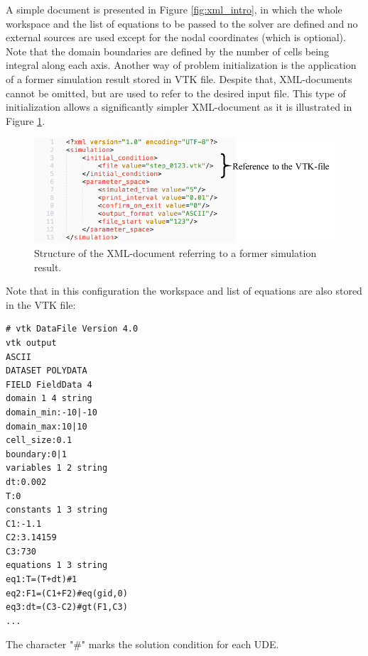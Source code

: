 \documentclass[a4paper,12pt,openany]{book}
\theoremstyle{break}
\begin{document}
A simple document is presented in Figure \ref{fig:xml_intro}, in which the whole workspace and the list of equations to be passed to the solver are defined and no external sources are used except for the nodal coordinates (which is optional). Note that the domain boundaries are defined by the number of cells being integral along each axis. Another way of problem initialization is the application of a former simulation result stored in VTK file. Despite that, XML-documents cannot be omitted, but are used to refer to the desired input file. This type of initialization allows a significantly simpler XML-document as it is illustrated in Figure \ref{fig:xml_intro_simple}.
\begin{figure}[H]
  \includegraphics[scale=1]{xml_intro_simple.pdf}
  \centering
  \caption{Structure of the XML-document referring to a former simulation result.}
  \label{fig:xml_intro_simple}
\end{figure}\vspace*{3pt}
\newpage
Note that in this configuration the workspace and list of equations are also stored in the VTK file:\\
\begin{lstlisting}
# vtk DataFile Version 4.0
vtk output
ASCII
DATASET POLYDATA
FIELD FieldData 4
domain 1 4 string
domain_min:-10|-10
domain_max:10|10
cell_size:0.1
boundary:0|1
variables 1 2 string
dt:0.002
T:0
constants 1 3 string
C1:-1.1
C2:3.14159
C3:730
equations 1 3 string
eq1:T=(T+dt)#1
eq2:F1=(C1+F2)#eq(gid,0)
eq3:dt=(C3-C2)#gt(F1,C3)
...
\end{lstlisting}
The character "\#" marks the solution condition for each UDE.
\end{document}
